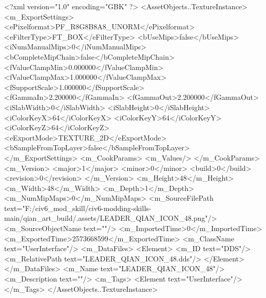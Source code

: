 <?xml version="1.0" encoding="GBK" ?>
<AssetObjects..TextureInstance>
	<m_ExportSettings>
		<ePixelformat>PF_R8G8B8A8_UNORM</ePixelformat>
		<eFilterType>FT_BOX</eFilterType>
		<bUseMips>false</bUseMips>
		<iNumManualMips>0</iNumManualMips>
		<bCompleteMipChain>false</bCompleteMipChain>
		<fValueClampMin>0.000000</fValueClampMin>
		<fValueClampMax>1.000000</fValueClampMax>
		<fSupportScale>1.000000</fSupportScale>
		<fGammaIn>2.200000</fGammaIn>
		<fGammaOut>2.200000</fGammaOut>
		<iSlabWidth>0</iSlabWidth>
		<iSlabHeight>0</iSlabHeight>
		<iColorKeyX>64</iColorKeyX>
		<iColorKeyY>64</iColorKeyY>
		<iColorKeyZ>64</iColorKeyZ>
		<eExportMode>TEXTURE_2D</eExportMode>
		<bSampleFromTopLayer>false</bSampleFromTopLayer>
	</m_ExportSettings>
	<m_CookParams>
		<m_Values/>
	</m_CookParams>
	<m_Version>
		<major>1</major>
		<minor>0</minor>
		<build>0</build>
		<revision>0</revision>
	</m_Version>
	<m_Height>48</m_Height>
	<m_Width>48</m_Width>
	<m_Depth>1</m_Depth>
	<m_NumMipMaps>0</m_NumMipMaps>
	<m_SourceFilePath text="F:/civ6_mod_skill/civ6-modding-skills-main/qian_art_build/.assets/LEADER_QIAN_ICON_48.png"/>
	<m_SourceObjectName text=""/>
	<m_ImportedTime>0</m_ImportedTime>
	<m_ExportedTime>2573668599</m_ExportedTime>
	<m_ClassName text="UserInterface"/>
	<m_DataFiles>
		<Element>
			<m_ID text="DDS"/>
			<m_RelativePath text="LEADER_QIAN_ICON_48.dds"/>
		</Element>
	</m_DataFiles>
	<m_Name text="LEADER_QIAN_ICON_48"/>
	<m_Description text=""/>
	<m_Tags>
		<Element text="UserInterface"/>
	</m_Tags>
</AssetObjects..TextureInstance>
